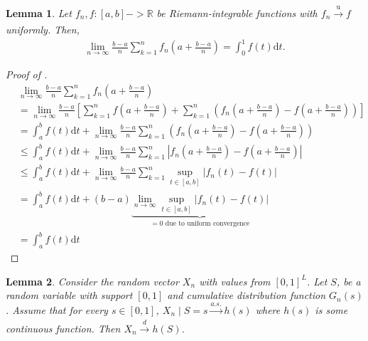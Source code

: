\documentclass[a4paper]{article}
\newtheorem{lemma}{Lemma}
\newcommand{\dt}{\mathrm{d}t}
\begin{document}
\begin{lemma}
    \label{lemma:integral_convergence}
    Let $f_n, f: [a, b] -> \mathbb{R}$ be Riemann-integrable functions with $f_n \xrightarrow[]{\mathrm{u}} f$ uniformly.
    Then,
    \begin{align*}
        \lim_{n \to \infty} \frac{b-a}{n} \sum_{k=1}^n f_n \left( a + \frac{b-a}{n} \right) = \int_0^1 f(t) \dt.
    \end{align*}
\end{lemma}
\begin{proof}[Proof of ]
    \begin{align*}
        &\lim_{n \to \infty} \frac{b-a}{n} \sum_{k=1}^n f_n \left( a + \frac{b-a}{n} \right) \\
        &= \lim_{n \to \infty} \frac{b-a}{n} \left[ \sum_{k=1}^n f \left( a + \frac{b-a}{n} \right) + \sum_{k=1}^n \left( f_n \left( a + \frac{b-a}{n} \right) - f \left( a + \frac{b-a}{n} \right) \right) \right] \\
        &= \int_a^b f(t) \dt + \lim_{n \to \infty} \frac{b-a}{n}\sum_{k=1}^n \left( f_n \left( a + \frac{b-a}{n} \right) - f \left( a + \frac{b-a}{n} \right) \right) \\
        &\leq \int_a^b f(t) \dt + \lim_{n \to \infty} \frac{b-a}{n}\sum_{k=1}^n \left| f_n \left( a + \frac{b-a}{n} \right) - f \left( a + \frac{b-a}{n} \right) \right| \\
        &\leq \int_a^b f(t) \dt + \lim_{n \to \infty} \frac{b-a}{n}\sum_{k=1}^n \sup_{t \in [a, b]} \left| f_n(t) - f(t) \right| \\
        &= \int_a^b f(t) \dt + (b-a) \underbrace{\lim_{n \to \infty} \sup_{t \in [a, b]} \left| f_n(t) - f(t) \right|}_{=0 \text{ due to uniform convergence}} \\
        &= \int_a^b f(t) \dt
    \end{align*}
\end{proof}

\begin{lemma}
    \label{lem:convergence_to_manifold}
    Consider the random vector $X_n$ with values from $[0, 1]^L$.
    Let $S$, be a random variable with support $[0, 1]$ and cumulative distribution function $G_n(s)$.
    Assume that for every $s \in [0, 1]$, $X_n \mid S = s \xrightarrow[]{a.s.} h(s)$ where $h(s)$ is some continuous function.
    Then $X_n \xrightarrow[]{d} h(S)$.
\end{lemma}
\end{document}
